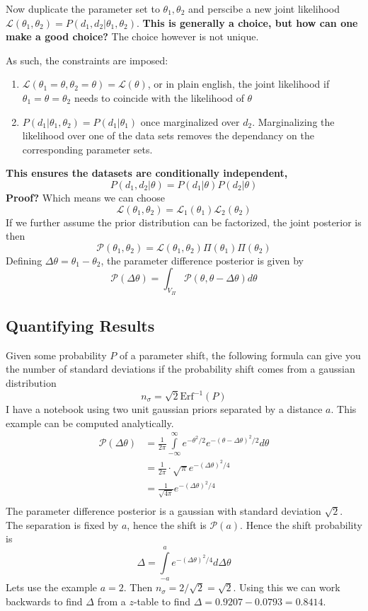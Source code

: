 Now duplicate the parameter set to $\theta_1,\theta_2$ and perscibe a new joint likelihood $\mathcal{L}(\theta_1,\theta_2) = P(d_1,d_2|\theta_1,\theta_2)$. \textbf{This is generally a choice, but how can one make a good choice?} The choice however is not unique.

As such, the constraints are imposed:
\begin{enumerate}
    \item $\mathcal{L}(\theta_1=\theta,\theta_2=\theta) = \mathcal{L}(\theta)$, or in plain english, the joint likelihood if $\theta_1=\theta=\theta_2$ needs to coincide with the likelihood of $\theta$
    \item $P(d_1|\theta_1,\theta_2)=P(d_1|\theta_1)$ once marginalized over $d_2$. Marginalizing the likelihood over one of the data sets removes the dependancy on the corresponding parameter sets.
\end{enumerate}
 \textbf{This ensures the datasets are conditionally independent,}
\[ P(d_1,d_2|\theta) = P(d_1|\theta)P(d_2|\theta) \]
\textbf{Proof?}
Which means we can choose 
\[ \mathcal{L}(\theta_1,\theta_2) = \mathcal{L}_1(\theta_1)\mathcal{L}_2(\theta_2) \]
If we further assume the prior distribution can be factorized, the joint posterior is then
\[ \mathcal{P}(\theta_1,\theta_2) = \mathcal{L}(\theta_1,\theta_2)\Pi(\theta_1)\Pi(\theta_2) \]
Defining $\Delta\theta = \theta_1-\theta_2$, the parameter difference posterior is given by
\[ \mathcal{P}(\Delta\theta) = \int_{V_\Pi} \mathcal{P}(\theta,\theta-\Delta\theta)d\theta\]

\subsection{Quantifying Results}

Given some probability $P$ of a parameter shift, the following formula can give you the number of standard deviations if the probability shift comes from a gaussian distribution
\[ n_\sigma = \sqrt{2} \text{Erf}^{-1}(P) \]
I have a notebook using two unit gaussian priors separated by a distance $a$. This example can be computed analytically.
\begin{equation*}
    \begin{split}
	\mathcal{P}(\Delta \theta) &= \frac{1}{2\pi} \int\limits_{-\infty}^{\infty} e^{-\theta^2/2} e^{-{(\theta-\Delta\theta)}^2/2}  d\theta \\
				   &= \frac{1}{2\pi} \cdot \sqrt{\pi} e^{-{(\Delta\theta)}^2/4}\\
				   &= \frac{1}{\sqrt{4\pi}}e^{-{(\Delta\theta)}^2/4}\\
    \end{split}
\end{equation*}
The parameter difference posterior is a gaussian with standard deviation $\sqrt{2}$. The separation is fixed by $a$, hence the shift is $\mathcal{P}(a)$. Hence the shift probability is
\[ \Delta = \int\limits_{-a}^{a} e^{-{(\Delta\theta)}^2/4} d\Delta\theta \]
Lets use the example $a=2$. Then $n_\sigma = 2/\sqrt{2} = \sqrt{2}$. Using this we can work backwards to find $\Delta$ from a $z$-table to find $\Delta = 0.9207 - 0.0793 = 0.8414 $. 

